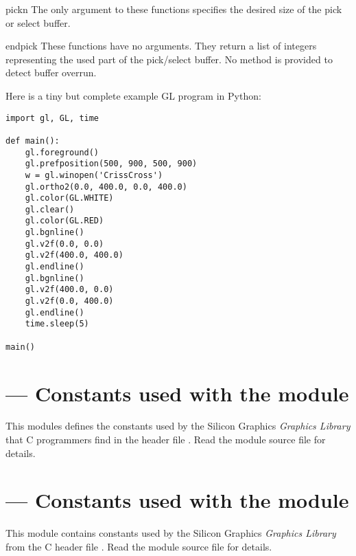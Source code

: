 \begin{funcdesc}{pick}{n}
The only argument to these functions specifies the desired size of the
pick or select buffer.
\end{funcdesc}

\begin{funcdesc}{endpick}{}
These functions have no arguments.
They return a list of integers representing the used part of the
pick/select buffer.
No method is provided to detect buffer overrun.
\end{funcdesc}

Here is a tiny but complete example GL program in Python:

\begin{verbatim}
import gl, GL, time

def main():
    gl.foreground()
    gl.prefposition(500, 900, 500, 900)
    w = gl.winopen('CrissCross')
    gl.ortho2(0.0, 400.0, 0.0, 400.0)
    gl.color(GL.WHITE)
    gl.clear()
    gl.color(GL.RED)
    gl.bgnline()
    gl.v2f(0.0, 0.0)
    gl.v2f(400.0, 400.0)
    gl.endline()
    gl.bgnline()
    gl.v2f(400.0, 0.0)
    gl.v2f(0.0, 400.0)
    gl.endline()
    time.sleep(5)

main()
\end{verbatim}


\section{ ---
         Constants used with the  module}


This modules defines the constants used by the Silicon Graphics
\emph{Graphics Library} that C programmers find in the header file
.
Read the module source file for details.


\section{ ---
         Constants used with the  module}


This module contains constants used by the Silicon Graphics
\emph{Graphics Library} from the C header file .
Read the module source file for details.
